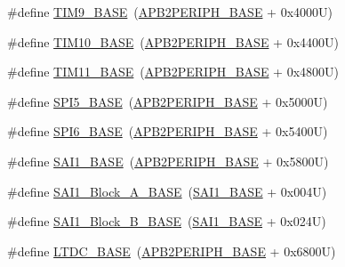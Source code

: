 \begin{DoxyCompactItemize}
\item 
\#define \hyperlink{group___peripheral__memory__map_ga92ae902be7902560939223dd765ece08}{T\+I\+M9\+\_\+\+B\+A\+SE}~(\hyperlink{group___peripheral__memory__map_ga25b99d6065f1c8f751e78f43ade652cb}{A\+P\+B2\+P\+E\+R\+I\+P\+H\+\_\+\+B\+A\+SE} + 0x4000\+U)
\item 
\#define \hyperlink{group___peripheral__memory__map_ga3eff32f3801db31fb4b61d5618cad54a}{T\+I\+M10\+\_\+\+B\+A\+SE}~(\hyperlink{group___peripheral__memory__map_ga25b99d6065f1c8f751e78f43ade652cb}{A\+P\+B2\+P\+E\+R\+I\+P\+H\+\_\+\+B\+A\+SE} + 0x4400\+U)
\item 
\#define \hyperlink{group___peripheral__memory__map_ga3a4a06bb84c703084f0509e105ffaf1d}{T\+I\+M11\+\_\+\+B\+A\+SE}~(\hyperlink{group___peripheral__memory__map_ga25b99d6065f1c8f751e78f43ade652cb}{A\+P\+B2\+P\+E\+R\+I\+P\+H\+\_\+\+B\+A\+SE} + 0x4800\+U)
\item 
\#define \hyperlink{group___peripheral__memory__map_gac1c58d33414e167d478ecd0e31331dfa}{S\+P\+I5\+\_\+\+B\+A\+SE}~(\hyperlink{group___peripheral__memory__map_ga25b99d6065f1c8f751e78f43ade652cb}{A\+P\+B2\+P\+E\+R\+I\+P\+H\+\_\+\+B\+A\+SE} + 0x5000\+U)
\item 
\#define \hyperlink{group___peripheral__memory__map_gaf69c602bd348dc0aa1b4e829e40ebb70}{S\+P\+I6\+\_\+\+B\+A\+SE}~(\hyperlink{group___peripheral__memory__map_ga25b99d6065f1c8f751e78f43ade652cb}{A\+P\+B2\+P\+E\+R\+I\+P\+H\+\_\+\+B\+A\+SE} + 0x5400\+U)
\item 
\#define \hyperlink{group___peripheral__memory__map_ga24c1053b754946b512f9c31123e09d21}{S\+A\+I1\+\_\+\+B\+A\+SE}~(\hyperlink{group___peripheral__memory__map_ga25b99d6065f1c8f751e78f43ade652cb}{A\+P\+B2\+P\+E\+R\+I\+P\+H\+\_\+\+B\+A\+SE} + 0x5800\+U)
\item 
\#define \hyperlink{group___peripheral__memory__map_ga31f72e5e5d7aea23bc8a5191bc32e900}{S\+A\+I1\+\_\+\+Block\+\_\+\+A\+\_\+\+B\+A\+SE}~(\hyperlink{group___peripheral__memory__map_ga24c1053b754946b512f9c31123e09d21}{S\+A\+I1\+\_\+\+B\+A\+SE} + 0x004\+U)
\item 
\#define \hyperlink{group___peripheral__memory__map_gacdb59b321830def8c7a57c154178bc48}{S\+A\+I1\+\_\+\+Block\+\_\+\+B\+\_\+\+B\+A\+SE}~(\hyperlink{group___peripheral__memory__map_ga24c1053b754946b512f9c31123e09d21}{S\+A\+I1\+\_\+\+B\+A\+SE} + 0x024\+U)
\item 
\#define \hyperlink{group___peripheral__memory__map_gac6e45c39fafa3e82cdedbf447b461704}{L\+T\+D\+C\+\_\+\+B\+A\+SE}~(\hyperlink{group___peripheral__memory__map_ga25b99d6065f1c8f751e78f43ade652cb}{A\+P\+B2\+P\+E\+R\+I\+P\+H\+\_\+\+B\+A\+SE} + 0x6800\+U)

\end{DoxyCompactItemize}
